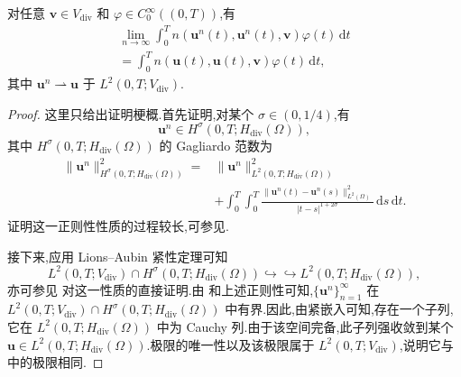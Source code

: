 \begin{lemma}[非线性对流项的收敛]\label{lem:time-dependent-convection-convergence}
对任意 $\bm{v}\in V_{\mathrm{div}}$ 和 $\varphi\in C_0^\infty((0,T))$,有
\begin{equation}\label{eq:time-dependent-nonlinear-convection-limit}
  \begin{gathered}
  \lim_{n\to\infty}\int_0^T
       n(\bm{u}^n(t),\bm{u}^n(t),\bm{v})\varphi(t)\,\mathrm{d}t
       \\
  =\int_0^T n(\bm{u}(t),\bm{u}(t),\bm{v})
       \varphi(t)\,\mathrm{d}t,
  \end{gathered}
\end{equation}
其中 $\bm{u}^n\rightharpoonup\bm{u}$ 于 $L^2(0,T;V_{\mathrm{div}})$.
\begin{proof}
这里只给出证明梗概.首先证明,对某个 $\sigma\in(0,1/4)$,有
\[
  \bm{u}^n\in H^\sigma(0,T;H_{\mathrm{div}}(\Omega)),
\]
其中 $H^\sigma(0,T;H_{\mathrm{div}}(\Omega))$ 的 Gagliardo 范数为
\[
\begin{aligned}
  \lVert\bm{u}^n\rVert_{H^\sigma(0,T;H_{\mathrm{div}}(\Omega))}^2
  ={}&\lVert\bm{u}^n\rVert_{L^2(0,T;H_{\mathrm{div}}(\Omega))}^2\\
   &+\int_0^T\int_0^T
      \frac{\lVert\bm{u}^n(t)-\bm{u}^n(s)\rVert_{L^2(\Omega)}^2}
           {|t-s|^{1+2\sigma}}\,\mathrm{d}s\,\mathrm{d}t.
\end{aligned}
\]
证明这一正则性性质的过程较长,可参见\textcite[第 V 章,引理 1.7]{GiraultRaviart1979}.

接下来,应用 Lions--Aubin 紧性定理可知
\[
  L^2(0,T;V_{\mathrm{div}})\cap
  H^\sigma(0,T;H_{\mathrm{div}}(\Omega))
  \hookrightarrow\hookrightarrow L^2(0,T;H_{\mathrm{div}}(\Omega)),
\]
亦可参见\textcite[第 V 章,引理 1.3]{GiraultRaviart1979} 对这一性质的直接证明.由 和上述正则性可知,$\{\bm{u}^n\}_{n=1}^\infty$ 在
$L^2(0,T;V_{\mathrm{div}})\cap H^\sigma(0,T;H_{\mathrm{div}}(\Omega))$ 中有界.因此,由紧嵌入可知,存在一个子列,它在 $L^2(0,T;H_{\mathrm{div}}(\Omega))$ 中为 Cauchy 列.由于该空间完备,此子列强收敛到某个
$\bm{u}\in L^2(0,T;H_{\mathrm{div}}(\Omega))$.极限的唯一性以及该极限属于 $L^2(0,T;V_{\mathrm{div}})$,说明它与 中的极限相同.


\end{proof}
\end{lemma}
